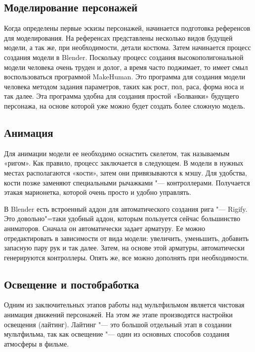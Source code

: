 \documentclass[10pt, a5paper]{article}
\begin{document}
\subsection*{Моделирование персонажей}

Когда определены первые эскизы персонажей, начинается подготовка референсов для моделирования. На референсах представлены несколько видов будущей модели, а так же, при необходимости, детали костюма. Затем начинается процесс создания модели в Blender. Поскольку процесс создания высокополигональной модели человека очень труден и долог, а время часто поджимает, то имеет смыл воспользоваться программой  MakeHuman. Это программа для создания модели человека методом задания параметров, таких как рост, пол, раса, форма носа и так далее. Эта программа удобна для создания простой «Болванки» будущего персонажа, на основе которой уже можно будет создать более сложную модель.

\subsection*{Анимация}

Для анимации модели ее необходимо оснастить скелетом, так называемым «ригом». Как правило, процесс заключается в следующем. В модели в нужных местах располагаются «кости», затем они привязываются к мэшу. Для удобства, кости позже заменяют специальными рычажками "--- контроллерами. Получается этакая марионетка, которой очень просто и удобно управлять.

В Blender есть встроенный аддон для автоматического создания рига "--- Rigify. Это довольно"=таки удобный аддон, которым пользуется сейчас большинство аниматоров. Сначала он автоматически задает арматуру. Ее можно отредактировать в зависимости от вида модели: увеличить, уменьшить, добавить запасную пару рук и так далее. Затем, на основе этой арматуры, автоматически генерируются контроллеры. Опять же, все можно дополнять при необходимости.

\subsection*{Освещение и постобработка}

Одним из заключительных этапов работы над мультфильмом является чистовая анимация движений персонажей. На этом же этапе производятся настройки освещения (лайтинг). Лайтинг "--- это большой отдельный этап в создании мультфильма, так как освещение "--- один из основных способов создания атмосферы в фильме.
 
\end{document}
